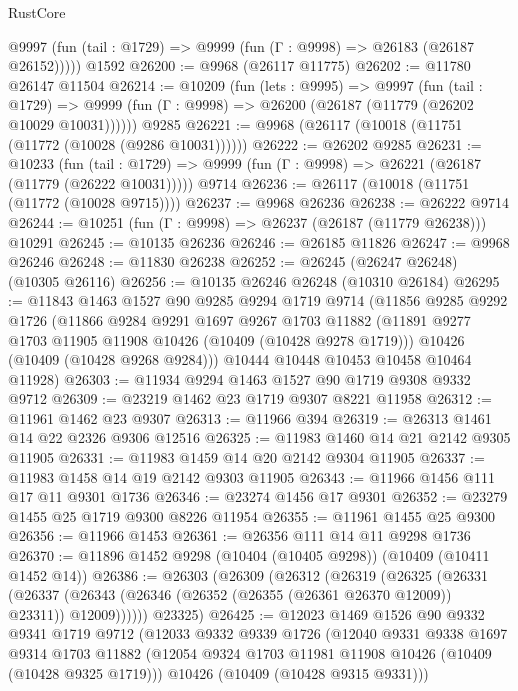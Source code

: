\begin{lexlean}{RustCore}
\begin{coremodule}
      @9997 (fun (tail : @1729) => @9999 (fun (Γ : @9998) => @26183 (@26187 @26152)))))
    @1592
@26200 := @9968 (@26117 @11775)
@26202 := @11780 @26147 @11504
@26214 := @10209
    (fun (lets : @9995) =>
    @9997
      (fun (tail : @1729) =>
      @9999 (fun (Γ : @9998) => @26200 (@26187 (@11779 (@26202 @10029 @10031))))))
    @9285
@26221 := @9968 (@26117 (@10018 (@11751 (@11772 (@10028 (@9286 @10031))))))
@26222 := @26202 @9285
@26231 := @10233
    (fun (tail : @1729) => @9999 (fun (Γ : @9998) => @26221 (@26187 (@11779 (@26222 @10031)))))
    @9714
@26236 := @26117 (@10018 (@11751 (@11772 (@10028 @9715))))
@26237 := @9968 @26236
@26238 := @26222 @9714
@26244 := @10251 (fun (Γ : @9998) => @26237 (@26187 (@11779 @26238))) @10291
@26245 := @10135 @26236
@26246 := @26185 @11826
@26247 := @9968 @26246
@26248 := @11830 @26238
@26252 := @26245 (@26247 @26248) (@10305 @26116)
@26256 := @10135 @26246 @26248 (@10310 @26184)
@26295 := @11843
    @1463
    @1527
    @90
    @9285
    @9294
    @1719
    @9714
    (@11856
      @9285
      @9292
      @1726
      (@11866
        @9284
        @9291
        @1697
        @9267
        @1703
        @11882
        (@11891 @9277 @1703 @11905 @11908 @10426 (@10409 (@10428 @9278 @1719)))
        @10426
        (@10409 (@10428 @9268 @9284)))
      @10444
      @10448
      @10453
      @10458
      @10464
      @11928)
@26303 := @11934 @9294 @1463 @1527 @90 @1719 @9308 @9332 @9712
@26309 := @23219 @1462 @23 @1719 @9307 @8221 @11958
@26312 := @11961 @1462 @23 @9307
@26313 := @11966 @394
@26319 := @26313 @1461 @14 @22 @2326 @9306 @12516
@26325 := @11983 @1460 @14 @21 @2142 @9305 @11905
@26331 := @11983 @1459 @14 @20 @2142 @9304 @11905
@26337 := @11983 @1458 @14 @19 @2142 @9303 @11905
@26343 := @11966 @1456 @111 @17 @11 @9301 @1736
@26346 := @23274 @1456 @17 @9301
@26352 := @23279 @1455 @25 @1719 @9300 @8226 @11954
@26355 := @11961 @1455 @25 @9300
@26356 := @11966 @1453
@26361 := @26356 @111 @14 @11 @9298 @1736
@26370 := @11896 @1452 @9298 (@10404 (@10405 @9298)) (@10409 (@10411 @1452 @14))
@26386 := @26303
    (@26309
      (@26312
        (@26319
          (@26325
            (@26331
              (@26337 (@26343 (@26346 (@26352 (@26355 (@26361 @26370 @12009)) @23311)) @12009))))))
      @23325)
@26425 := @12023
    @1469
    @1526
    @90
    @9332
    @9341
    @1719
    @9712
    (@12033
      @9332
      @9339
      @1726
      (@12040
        @9331
        @9338
        @1697
        @9314
        @1703
        @11882
        (@12054 @9324 @1703 @11981 @11908 @10426 (@10409 (@10428 @9325 @1719)))
        @10426
        (@10409 (@10428 @9315 @9331)))

\end{coremodule}
\end{lexlean}
